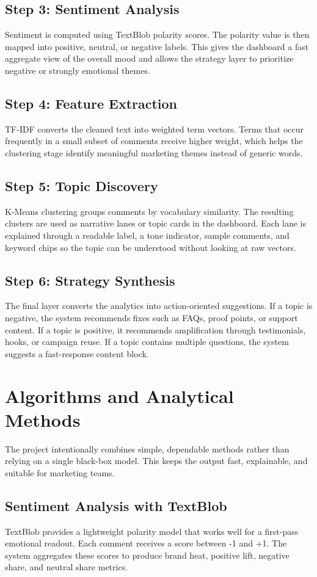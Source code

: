 \subsection{Step 3: Sentiment Analysis}
Sentiment is computed using TextBlob polarity scores. The polarity value is then mapped into positive, neutral, or negative labels. This gives the dashboard a fast aggregate view of the overall mood and allows the strategy layer to prioritize negative or strongly emotional themes.

\subsection{Step 4: Feature Extraction}
TF-IDF converts the cleaned text into weighted term vectors. Terms that occur frequently in a small subset of comments receive higher weight, which helps the clustering stage identify meaningful marketing themes instead of generic words.

\subsection{Step 5: Topic Discovery}
K-Means clustering groups comments by vocabulary similarity. The resulting clusters are used as narrative lanes or topic cards in the dashboard. Each lane is explained through a readable label, a tone indicator, sample comments, and keyword chips so the topic can be understood without looking at raw vectors.

\subsection{Step 6: Strategy Synthesis}
The final layer converts the analytics into action-oriented suggestions. If a topic is negative, the system recommends fixes such as FAQs, proof points, or support content. If a topic is positive, it recommends amplification through testimonials, hooks, or campaign reuse. If a topic contains multiple questions, the system suggests a fast-response content block.

\section{Algorithms and Analytical Methods}
The project intentionally combines simple, dependable methods rather than relying on a single black-box model. This keeps the output fast, explainable, and suitable for marketing teams.

\subsection{Sentiment Analysis with TextBlob}
TextBlob provides a lightweight polarity model that works well for a first-pass emotional readout. Each comment receives a score between -1 and +1. The system aggregates these scores to produce brand heat, positive lift, negative share, and neutral share metrics.

